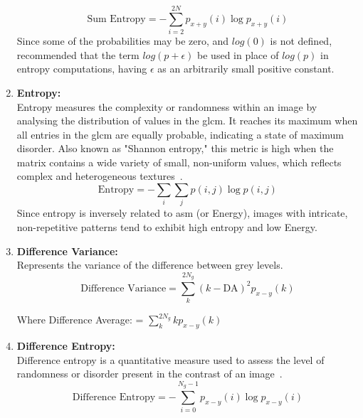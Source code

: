 \begin{enumerate}
        \begin{equation}
            \text{Sum Entropy} = -\sum_{i=2}^{2N} p_{x+y}(i) \log p_{x+y}(i)
        \end{equation}
        Since some of the probabilities may be zero, and $log(0)$ is not defined, \textcite{haralick_textural_1973} recommended that the term $log (p + \epsilon)$ be used in place of $log (p)$ in entropy computations, having $\epsilon$ as an arbitrarily small positive constant.
        
    \item \textbf{Entropy:}\\
    Entropy measures the complexity or randomness within an image by analysing the distribution of values in the \ac{glcm}. It reaches its maximum when all entries in the \ac{glcm} are equally probable, indicating a state of maximum disorder. Also known as "Shannon entropy," this metric is high when the matrix contains a wide variety of small, non-uniform values, which reflects complex and heterogeneous textures~\cite{oprisan_bounds_2023}.
        \begin{equation}
            \text{Entropy} = -\sum_{i} \sum_{j} p(i,j) \log p(i,j)
        \end{equation}
    Since entropy is inversely related to \ac{asm} (or Energy), images with intricate, non-repetitive patterns tend to exhibit high entropy and low Energy.
        
    \item \textbf{Difference Variance:}\\
    Represents the variance of the difference between grey levels.
        \begin{equation}
            \text{Difference Variance} = \sum_{k}^{2N_g} (k - \text{DA})^{2} p_{x-y}(k)
        \end{equation}

    Where Difference Average:  = $\sum_k^{2N_g} k p_{x-y}(k)$ 
        
    \item \textbf{Difference Entropy:}\\
    Difference entropy is a quantitative measure used to assess the level of randomness or disorder present in the contrast of an image~\cite{oprisan_bounds_2023}.
        \begin{equation}
            \text{Difference Entropy} = -\sum_{i=0}^{N_g-1} p_{x-y}(i) \log p_{x-y}(i)
        \end{equation}
        

\end{enumerate}
